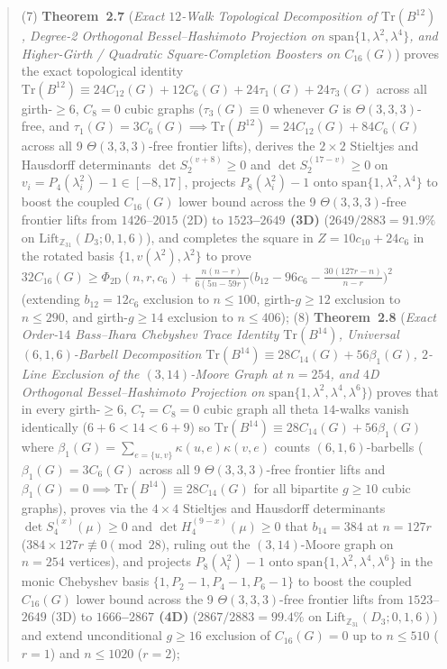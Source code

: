 \documentclass[10pt,a4paper]{article}
\theoremstyle{definition}
\theoremstyle{remark}
\begin{document}
\begin{abstract}
(7) \textbf{Theorem~2.7} (\emph{Exact $12$-Walk Topological Decomposition of $\mathrm{Tr}(B^{12})$, Degree-2 Orthogonal Bessel--Hashimoto Projection on $\mathrm{span}\{1, \lambda^2, \lambda^4\}$, and Higher-Girth / Quadratic Square-Completion Boosters on $C_{16}(G)$}) proves the exact topological identity $\mathrm{Tr}(B^{12}) \equiv 24 C_{12}(G) + 12 C_6(G) + 24 \tau_1(G) + 24 \tau_3(G)$ across all girth-$\ge 6$, $C_8=0$ cubic graphs ($\tau_3(G) \equiv 0$ whenever $G$ is $\Theta(3,3,3)$-free, and $\tau_1(G) = 3 C_6(G) \implies \mathrm{Tr}(B^{12}) = 24 C_{12}(G) + 84 C_6(G)$ across all 9 $\Theta(3,3,3)$-free frontier lifts), derives the $2 \times 2$ Stieltjes and Hausdorff determinants $\det S_2^{(v+8)} \ge 0$ and $\det S_2^{(17-v)} \ge 0$ on $v_i = P_4(\lambda_i^2)-1 \in [-8, 17]$, projects $P_8(\lambda_i^2)-1$ onto $\mathrm{span}\{1, \lambda^2, \lambda^4\}$ to boost the coupled $C_{16}(G)$ lower bound across the 9 $\Theta(3,3,3)$-free frontier lifts from $1426$--$2015$ (2D) to \textbf{$1523$--$2649$ (3D)} ($2649/2883 = 91.9\%$ on $\mathrm{Lift}_{\mathbb{Z}_{31}}(D_3; 0, 1, 6)$), and completes the square in $Z = 10 c_{10} + 24 c_6$ in the rotated basis $\{1, v(\lambda^2), \lambda^2\}$ to prove $32 C_{16}(G) \ge \Phi_{\mathrm{2D}}(n, r, c_6) + \frac{n(n-r)}{6(5n-59r)}\bigl(b_{12} - 96 c_6 - \frac{30(127r-n)}{n-r}\bigr)^2$ (extending $b_{12}=12 c_6$ exclusion to $n \le 100$, girth-$g \ge 12$ exclusion to $n \le 290$, and girth-$g \ge 14$ exclusion to $n \le 406$);
(8) \textbf{Theorem~2.8} (\emph{Exact Order-$14$ Bass--Ihara Chebyshev Trace Identity $\mathrm{Tr}(B^{14})$, Universal $(6,1,6)$-Barbell Decomposition $\mathrm{Tr}(B^{14}) \equiv 28 C_{14}(G) + 56 \beta_1(G)$, $2$-Line Exclusion of the $(3,14)$-Moore Graph at $n=254$, and $4$D Orthogonal Bessel--Hashimoto Projection on $\mathrm{span}\{1, \lambda^2, \lambda^4, \lambda^6\}$}) proves that in every girth-$\ge 6$, $C_7=C_8=0$ cubic graph all theta $14$-walks vanish identically ($6+6 < 14 < 6+9$) so $\mathrm{Tr}(B^{14}) \equiv 28 C_{14}(G) + 56 \beta_1(G)$ where $\beta_1(G) = \sum_{e=\{u,v\}} \kappa(u,e)\kappa(v,e)$ counts $(6,1,6)$-barbells ($\beta_1(G) = 3 C_6(G)$ across all 9 $\Theta(3,3,3)$-free frontier lifts and $\beta_1(G) = 0 \implies \mathrm{Tr}(B^{14}) \equiv 28 C_{14}(G)$ for all bipartite $g \ge 10$ cubic graphs), proves via the $4 \times 4$ Stieltjes and Hausdorff determinants $\det S_4^{(x)}(\mu) \ge 0$ and $\det H_4^{(9-x)}(\mu) \ge 0$ that $b_{14} = 384$ at $n = 127r$ ($384 \times 127r \not\equiv 0 \pmod{28}$, ruling out the $(3,14)$-Moore graph on $n=254$ vertices), and projects $P_8(\lambda_i^2)-1$ onto $\mathrm{span}\{1, \lambda^2, \lambda^4, \lambda^6\}$ in the monic Chebyshev basis $\{1, P_2-1, P_4-1, P_6-1\}$ to boost the coupled $C_{16}(G)$ lower bound across the 9 $\Theta(3,3,3)$-free frontier lifts from $1523$--$2649$ (3D) to \textbf{$1666$--$2867$ (4D)} ($2867/2883 = \mathbf{99.4\%}$ on $\mathrm{Lift}_{\mathbb{Z}_{31}}(D_3; 0, 1, 6)$) and extend unconditional $g \ge 16$ exclusion of $C_{16}(G)=0$ up to $n \le 510$ ($r=1$) and $n \le 1020$ ($r=2$);

\end{abstract}
\end{document}
